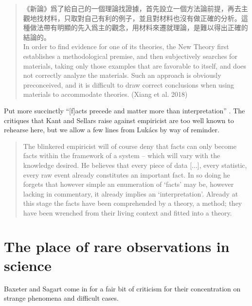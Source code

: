 \begin{quote}
《新論》爲了給自己的一個理論找證據，首先設立一個方法論前提，再去主觀地找材料，只取對自己有利的例子，並且對材料也沒有做正確的分析。這種做法帶有明顯的先入爲主的觀念，用材料來遷就理論，是難以得出正確的結論的。\\
In order to find evidence for one of its theories, the New Theory first establishes a methodological premise, and then subjectively searches for materials, taking only those examples that are favorable to itself, and does not correctly analyze the materials. 
Such an approach is obviously preconceived, and it is difficult to draw correct conclusions when using materials to accommodate theories. (Xiang et al. 2018)
\end{quote}
Put more succinctly ``[f]acts precede and matter more than interpretation'' \citep[183]{Ho2016}. 
The critiques that Kant and Sellars raise against empiricist  are too well known to rehearse here, but we allow a few lines from Lukács by way of reminder.

\begin{quote}
The blinkered empiricist will of course deny that facts can only become facts within the framework of a system -- which will vary with the knowledge desired. He believes that every piece of data [...], every statistic, every raw event already constitutes an important fact. In so doing he forgets that however simple an enumeration of `facts' may be, however lacking in commentary, it already implies an `interpretation'. Already at this stage the facts have been comprehended by a theory, a method; they have been wrenched from their living context and fitted into a theory.
\citep[PAGES]{Lukacs1923}
\end{quote} 


\section{The place of rare observations in science}
Baxeter and Sagart come in for a fair bit of criticism for their concentration on strange phenomena and difficult cases. 

